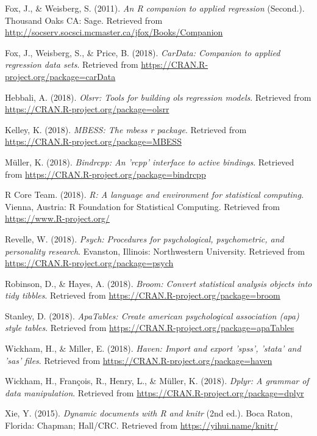 \documentclass[man,floatsintext]{apa6}
\begin{document}
\hypertarget{ref-R-car}{}
Fox, J., \& Weisberg, S. (2011). \emph{An R companion to applied
regression} (Second.). Thousand Oaks CA: Sage. Retrieved from
\url{http://socserv.socsci.mcmaster.ca/jfox/Books/Companion}

\hypertarget{ref-R-carData}{}
Fox, J., Weisberg, S., \& Price, B. (2018). \emph{CarData: Companion to
applied regression data sets}. Retrieved from
\url{https://CRAN.R-project.org/package=carData}

\hypertarget{ref-R-olsrr}{}
Hebbali, A. (2018). \emph{Olsrr: Tools for building ols regression
models}. Retrieved from \url{https://CRAN.R-project.org/package=olsrr}

\hypertarget{ref-R-MBESS}{}
Kelley, K. (2018). \emph{MBESS: The mbess r package}. Retrieved from
\url{https://CRAN.R-project.org/package=MBESS}

\hypertarget{ref-R-bindrcpp}{}
Müller, K. (2018). \emph{Bindrcpp: An 'rcpp' interface to active
bindings}. Retrieved from
\url{https://CRAN.R-project.org/package=bindrcpp}

\hypertarget{ref-R-base}{}
R Core Team. (2018). \emph{R: A language and environment for statistical
computing}. Vienna, Austria: R Foundation for Statistical Computing.
Retrieved from \url{https://www.R-project.org/}

\hypertarget{ref-R-psych}{}
Revelle, W. (2018). \emph{Psych: Procedures for psychological,
psychometric, and personality research}. Evanston, Illinois:
Northwestern University. Retrieved from
\url{https://CRAN.R-project.org/package=psych}

\hypertarget{ref-R-broom}{}
Robinson, D., \& Hayes, A. (2018). \emph{Broom: Convert statistical
analysis objects into tidy tibbles}. Retrieved from
\url{https://CRAN.R-project.org/package=broom}

\hypertarget{ref-R-apaTables}{}
Stanley, D. (2018). \emph{ApaTables: Create american psychological
association (apa) style tables}. Retrieved from
\url{https://CRAN.R-project.org/package=apaTables}

\hypertarget{ref-R-haven}{}
Wickham, H., \& Miller, E. (2018). \emph{Haven: Import and export
'spss', 'stata' and 'sas' files}. Retrieved from
\url{https://CRAN.R-project.org/package=haven}

\hypertarget{ref-R-dplyr}{}
Wickham, H., François, R., Henry, L., \& Müller, K. (2018). \emph{Dplyr:
A grammar of data manipulation}. Retrieved from
\url{https://CRAN.R-project.org/package=dplyr}

\hypertarget{ref-R-knitr}{}
Xie, Y. (2015). \emph{Dynamic documents with R and knitr} (2nd ed.).
Boca Raton, Florida: Chapman; Hall/CRC. Retrieved from
\url{https://yihui.name/knitr/}

\endgroup
\end{document}
